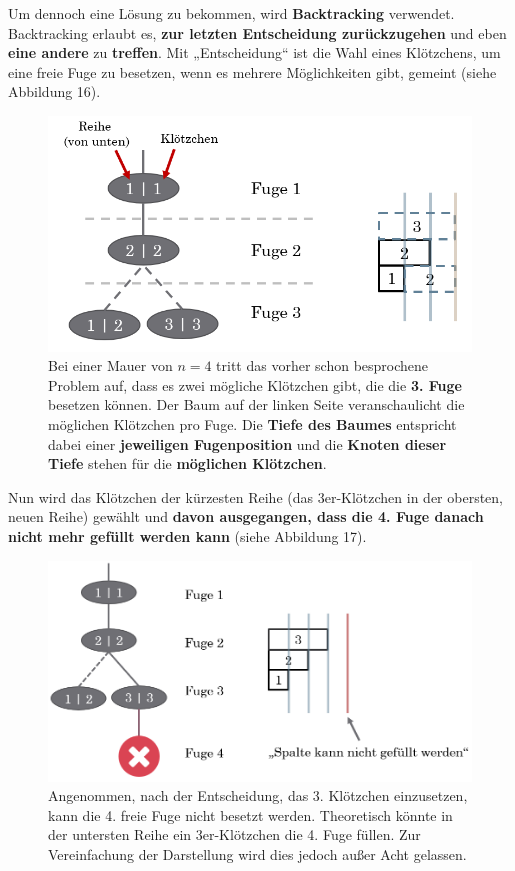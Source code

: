 \documentclass[a4paper,12pt]{article}
\begin{document}
Um dennoch eine Lösung zu bekommen, wird \textbf{Backtracking} \cite{backtracking} verwendet. Backtracking erlaubt es, \textbf{zur letzten Entscheidung zurückzugehen} und eben \textbf{eine andere} zu \textbf{treffen}. Mit „Entscheidung“ ist die Wahl eines Klötzchens, um eine freie Fuge zu besetzen, wenn es mehrere Möglichkeiten gibt, gemeint (siehe Abbildung 16).
\begin{figure}[H]
    \centering
    \includegraphics[width=1\linewidth]{Bilder/Aufgabe1/Backtracking_01.png}
    \caption{Bei einer Mauer von $n = 4$ tritt das vorher schon besprochene Problem auf, dass es zwei mögliche Klötzchen gibt, die die \textbf{3. Fuge} besetzen können. Der Baum auf der linken Seite veranschaulicht die möglichen Klötzchen pro Fuge. Die \textbf{Tiefe des Baumes} entspricht dabei einer \textbf{jeweiligen Fugenposition} und die \textbf{Knoten dieser Tiefe} stehen für die \textbf{möglichen Klötzchen}.}
\end{figure}
Nun wird das Klötzchen der kürzesten Reihe (das 3er-Klötzchen in der obersten, neuen Reihe) gewählt und \textbf{davon ausgegangen, dass die 4. Fuge danach nicht mehr gefüllt werden kann} (siehe Abbildung 17).
\begin{figure}[H]
    \centering
    \includegraphics[width=1\linewidth]{Bilder/Aufgabe1/Backtracking_02.png}
    \caption{Angenommen, nach der Entscheidung, das 3. Klötzchen einzusetzen, kann die 4. freie Fuge nicht besetzt werden. Theoretisch könnte in der untersten Reihe ein 3er-Klötzchen die 4. Fuge füllen. Zur Vereinfachung der Darstellung wird dies jedoch außer Acht gelassen.}
\end{figure}
\end{document}

